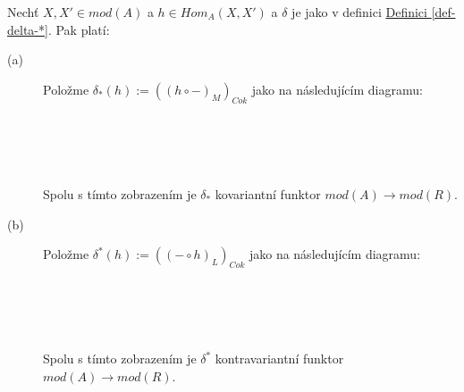      \begin{thm}\label{thm-delta}
       Nechť $X,X'\in mod(A)$ a $h\in Hom_A(X,X')$ a $\delta$ je jako v definici 
       \hyperref[def-delta-*]{Definici \ref*{def-delta-*}}. Pak platí:
       \begin{description}
         \item[(a)] Položme $\delta_*(h):=((h \circ -)_M)_{Cok}$ jako na následujícím diagramu:  \\\\
           \centerline{}\\\\\\
           Spolu s tímto zobrazením je $\delta_*$ kovariantní funktor $mod(A)\rightarrow mod(R)$.

         \item[(b)] Položme $\delta^*(h):=((-\circ h)_L)_{Cok}$ jako na následujícím diagramu: \\\\
          \centerline{}\\\\\\
           Spolu s tímto zobrazením je $\delta^*$ kontravariantní funktor $mod(A)\rightarrow mod(R)$.
       \end{description}
     \end{thm}
     
